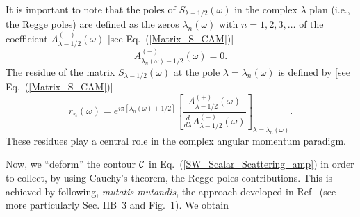 \documentclass[aps,prd,longbibliography,reprint,twocolumn,amsmath,amssymb,amsfonts,showpacs,superscriptaddress]{revtex4-1}%
\begin{document}
It is important to note that the poles of  $S_{\lambda -1/2} (\omega)$ in the complex $\lambda$ plan (i.e., the Regge poles) are defined  as  the zeros $\lambda_n(\omega)$ with $n=1,2,3,\ldots$ of the coefficient  $A^{(-)}_{\lambda-1/2} (\omega)$ [see Eq.~(\ref{Matrix_S_CAM})]
\begin{equation}\label{PR_def_Am}
A^{(-)}_{\lambda_n(\omega)-1/2} (\omega)=0.
\end{equation}
The residue of the matrix $S_{\lambda-1/2}(\omega)$ at the pole $\lambda=\lambda_n(\omega)$ is defined by [see Eq.~(\ref{Matrix_S_CAM})]
\begin{equation}\label{residues_RP}
r_n(\omega)=e^{i\pi [\lambda_n(\omega)+1/2]} \left[ \frac{A_{\lambda -1/2}^{(+)}(\omega)}{\frac{d}{d \lambda}A_{\lambda -1/2}^{(-)}(\omega)}\right]_{\lambda=\lambda_n(\omega)}.
\end{equation}
These residues play a central role in the complex angular momentum paradigm.


Now, we ``deform'' the contour ${\cal C}$ in Eq.~(\ref{SW_Scalar_Scattering_amp}) in order to collect, by using Cauchy's theorem, the Regge poles contributions. This is achieved by following, \textit{mutatis mutandis}, the approach developed in Ref~\cite{Folacci:2019cmc} (see more particularly Sec. IIB~3 and Fig.~1). We obtain
\end{document}

